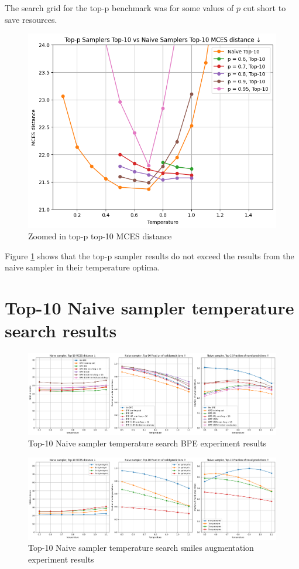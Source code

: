 The search grid for the top-p benchmark was for some values of $p$ cut short to save resources.

\begin{figure}[h]
    \centering
    \includegraphics[width=0.6\linewidth]{figures/appendix/samplers/top-p_vs_naive_top-10.png}
    \caption{Zoomed in top-p top-10 MCES distance}
    \label{fig:top-p_zoomed_appendix}
\end{figure}

Figure \ref{fig:top-p_zoomed_appendix} shows that the top-p sampler results do not exceed the results from the naive sampler in their temperature optima.


\section{Top-10 Naive sampler temperature search results}
\label{sec:temp_search_appendix}

\begin{figure}[h]
    \centering
    \includegraphics[width=1.0\textwidth]{figures/appendix/bpe.png}
    \caption{Top-10 Naive sampler temperature search BPE experiment results}
    \label{fig:bpe_appendix}
\end{figure}

\begin{figure}[h]
    \centering
    \includegraphics[width=1.0\textwidth]{figures/appendix/smiles_augmentation.png}
    \caption{Top-10 Naive sampler temperature search smiles augmentation experiment results}
    \label{fig:bpe_appendix}
\end{figure}


